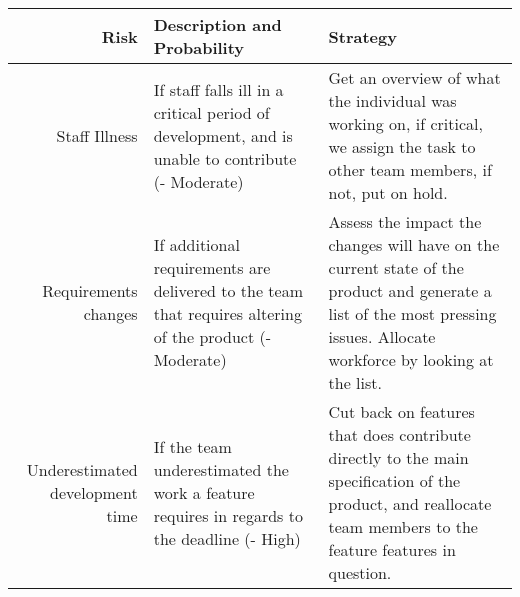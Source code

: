 \documentclass[12pt]{article}%
\begin{document}
\begin{tabularx}{\linewidth}{ r X X }
\hline
Risk & Description and Probability & Strategy \\ \hline

Staff Illness
& If staff falls ill in a critical period of development, and is unable to contribute (- Moderate)
& Get an overview of what the individual was working on, if critical, we assign the task to other team members, if not, put on hold.\\

Requirements changes
&If additional requirements are delivered to the team that requires altering of the product (- Moderate)
& Assess the impact the changes will have on the current state of the product and generate a list of the most pressing issues. Allocate workforce by looking at the list.\\ \hline
Underestimated development time
&If the team underestimated the work a feature requires in regards to the deadline (- High)
& Cut back on features that does contribute directly to the main specification of the product, and reallocate team members to the feature features in question.                 \\ \hline
\end{tabularx}
\end{document}
